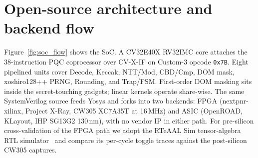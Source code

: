 \documentclass[10pt,conference]{IEEEtran}
\begin{document}
\section{Open-source architecture and backend flow}
\label{sec:arch}
Figure~\ref{fig:soc_flow} shows the SoC. A CV32E40X RV32IMC core attaches the 38-instruction PQC coprocessor over CV-X-IF on Custom-3 opcode \texttt{0x7B}. Eight pipelined units cover Decode, Keccak, NTT/Mod, CBD/Cmp, DOM mask, xoshiro128++ PRNG, Rounding, and Trap/FSM. First-order DOM masking sits inside the secret-touching gadgets; linear kernels operate share-wise. The same SystemVerilog source feeds Yosys and forks into two backends: FPGA (nextpnr-xilinx, Project X-Ray, CW305 XC7A35T at 16\,MHz) and ASIC (OpenROAD, KLayout, IHP SG13G2 130\,nm), with no vendor IP in either path. For pre-silicon cross-validation of the FPGA path we adopt the RTeAAL Sim tensor-algebra RTL simulator~\cite{rtl2aal} and compare its per-cycle toggle traces against the post-silicon CW305 captures.

\end{document}
